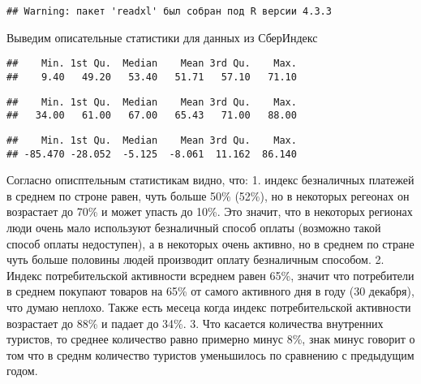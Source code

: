 \documentclass[
]{article}
\newenvironment{Shaded}{\begin{snugshade}}{\end{snugshade}}
\newcommand{\FunctionTok}[1]{\textcolor[rgb]{0.13,0.29,0.53}{\textbf{#1}}}
\newcommand{\NormalTok}[1]{#1}
\newcommand{\SpecialCharTok}[1]{\textcolor[rgb]{0.81,0.36,0.00}{\textbf{#1}}}
\begin{document}
\begin{verbatim}
## Warning: пакет 'readxl' был собран под R версии 4.3.3
\end{verbatim}

Выведим описательные статистики для данных из СберИндекс

\begin{Shaded}
\end{Shaded}

\begin{verbatim}
##    Min. 1st Qu.  Median    Mean 3rd Qu.    Max. 
##    9.40   49.20   53.40   51.71   57.10   71.10
\end{verbatim}

\begin{Shaded}
\end{Shaded}

\begin{verbatim}
##    Min. 1st Qu.  Median    Mean 3rd Qu.    Max. 
##   34.00   61.00   67.00   65.43   71.00   88.00
\end{verbatim}

\begin{Shaded}
\end{Shaded}

\begin{verbatim}
##    Min. 1st Qu.  Median    Mean 3rd Qu.    Max. 
## -85.470 -28.052  -5.125  -8.061  11.162  86.140
\end{verbatim}

Согласно описптельным статистикам видно, что: 1. индекс безналичных
платежей в среднем по строне равен, чуть больше 50\% (52\%), но в
некоторых регеонах он возрастает до 70\% и может упасть до 10\%. Это
значит, что в некоторых регионах люди очень мало используют безналичный
способ оплаты (возможно такой способ оплаты недоступен), а в некоторых
очень активно, но в среднем по стране чуть больше половины людей
производит оплату безналичным способом. 2. Индекс потребительской
активности всреднем равен 65\%, значит что потребители в среднем
покупают товаров на 65\% от самого активного дня в году (30 декабря),
что думаю неплохо. Также есть месеца когда индекс потребительской
активности возрастает до 88\% и падает до 34\%. 3. Что касается
количества внутренних туристов, то среднее количество равно примерно
минус 8\%, знак минус говорит о том что в среднм количество туристов
уменьшилось по сравнению с предыдущим годом.
\end{document}
